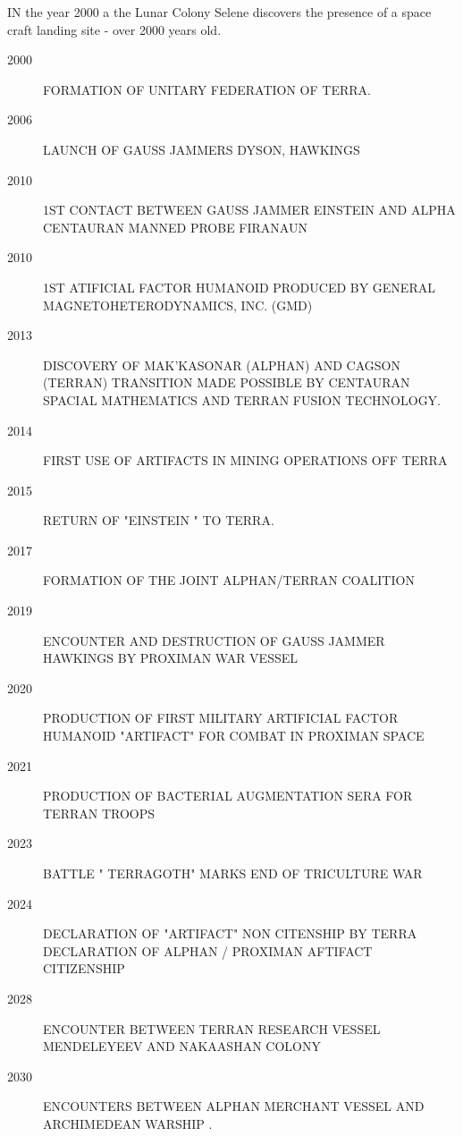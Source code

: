 IN the year 2000 a the Lunar Colony Selene discovers the
presence of a space craft landing site - over 2000 years
old.
\begin{description}
	\item[2000] FORMATION OF UNITARY FEDERATION OF TERRA.
	\item[2006] LAUNCH OF GAUSS JAMMERS DYSON, HAWKINGS
	\item[2010] 1ST CONTACT BETWEEN GAUSS JAMMER EINSTEIN AND ALPHA
CENTAURAN MANNED PROBE FIRANAUN
	\item[2010] 1ST ATIFICIAL FACTOR HUMANOID PRODUCED BY GENERAL
MAGNETOHETERODYNAMICS, INC. (GMD)
	\item[2013] DISCOVERY OF MAK'KASONAR (ALPHAN) AND CAGSON (TERRAN)
TRANSITION MADE POSSIBLE BY CENTAURAN SPACIAL
MATHEMATICS AND TERRAN FUSION TECHNOLOGY.
	\item[2014] FIRST USE OF ARTIFACTS IN MINING OPERATIONS OFF TERRA
	\item[2015] RETURN OF "EINSTEIN " TO TERRA.
	\item[2017] FORMATION OF THE JOINT ALPHAN/TERRAN COALITION
	\item[2019] ENCOUNTER AND DESTRUCTION OF GAUSS JAMMER HAWKINGS
BY PROXIMAN WAR VESSEL
	\item[2020] PRODUCTION OF FIRST MILITARY ARTIFICIAL FACTOR
HUMANOID "ARTIFACT" FOR COMBAT IN PROXIMAN SPACE
	\item[2021] PRODUCTION OF BACTERIAL AUGMENTATION SERA FOR TERRAN
TROOPS
	\item[2023] BATTLE " TERRAGOTH" MARKS END OF TRICULTURE WAR
	\item[2024] DECLARATION OF "ARTIFACT" NON CITENSHIP BY TERRA
DECLARATION OF ALPHAN / PROXIMAN AFTIFACT CITIZENSHIP
	\item[2028] ENCOUNTER BETWEEN TERRAN RESEARCH VESSEL MENDELEYEEV
AND NAKAASHAN COLONY
	\item[2030] ENCOUNTERS BETWEEN ALPHAN MERCHANT VESSEL AND
ARCHIMEDEAN WARSHIP .
\end{description}






